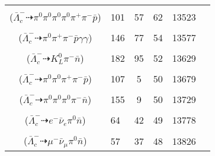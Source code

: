 \documentclass[landscape]{article}
\newcounter{rownumbers}
\newcommand\rn{\stepcounter{rownumbers}\arabic{rownumbers}}
\newcommand{\EOL}{\\} %
\newcommand{\topoTags}[1]{#1} %
\begin{document}
\begin{longtable}{clcccc}
\rn & \makecell[l]{ $ 
\bar{\Lambda}_{c}^{-} \rightarrow \eta^{\prime} \bar{\Sigma}^{-} ,
\eta^{\prime} \rightarrow \pi^{+} \pi^{-} \eta ,
\bar{\Sigma}^{-} \rightarrow \pi^{0} \bar{p} ,
\eta \rightarrow \pi^{0} \pi^{0} \pi^{0} 
$ \\ ($
\bar{\Lambda}_{c}^{-} \dashrightarrow \pi^{0} \pi^{0} \pi^{0} \pi^{0} \pi^{+} \pi^{-} \bar{p} 
$) } & \topoTags{101 & 57 & }62 & 13523 \EOL

\rn & \makecell[l]{ $ 
\bar{\Lambda}_{c}^{-} \rightarrow \eta^{\prime} \bar{\Sigma}^{-} ,
\eta^{\prime} \rightarrow \pi^{+} \pi^{-} \eta ,
\bar{\Sigma}^{-} \rightarrow \pi^{0} \bar{p} ,
\eta \rightarrow \gamma \gamma 
$ \\ ($
\bar{\Lambda}_{c}^{-} \dashrightarrow \pi^{0} \pi^{+} \pi^{-} \bar{p} \gamma \gamma 
$) } & \topoTags{146 & 77 & }54 & 13577 \EOL

\rn & \makecell[l]{ $ 
\bar{\Lambda}_{c}^{-} \rightarrow \pi^{-} K^{0} \bar{n} ,
K^{0} \rightarrow K_{L}^{0} 
$ \\ ($
\bar{\Lambda}_{c}^{-} \dashrightarrow K_{L}^{0} \pi^{-} \bar{n} 
$) } & \topoTags{182 & 95 & }52 & 13629 \EOL

\rn & \makecell[l]{ $ 
\bar{\Lambda}_{c}^{-} \rightarrow \omega \bar{\Delta}^{-} ,
\omega \rightarrow \pi^{0} \pi^{+} \pi^{-} ,
\bar{\Delta}^{-} \rightarrow \pi^{0} \bar{p} 
$ \\ ($
\bar{\Lambda}_{c}^{-} \dashrightarrow \pi^{0} \pi^{0} \pi^{+} \pi^{-} \bar{p} 
$) } & \topoTags{107 & 5 & }50 & 13679 \EOL

\rn & \makecell[l]{ $ 
\bar{\Lambda}_{c}^{-} \rightarrow \pi^{0} \pi^{-} K^{0} \bar{n} ,
K^{0} \rightarrow K_{S}^{0} ,
K_{S}^{0} \rightarrow \pi^{0} \pi^{0} 
$ \\ ($
\bar{\Lambda}_{c}^{-} \dashrightarrow \pi^{0} \pi^{0} \pi^{0} \pi^{-} \bar{n} 
$) } & \topoTags{155 & 9 & }50 & 13729 \EOL

\rn & \makecell[l]{ $ 
\bar{\Lambda}_{c}^{-} \rightarrow e^{-} \bar{\nu}_{e} \bar{\Lambda} ,
\bar{\Lambda} \rightarrow \pi^{0} \bar{n} 
$ \\ ($
\bar{\Lambda}_{c}^{-} \dashrightarrow e^{-} \bar{\nu}_{e} \pi^{0} \bar{n} 
$) } & \topoTags{64 & 42 & }49 & 13778 \EOL

\rn & \makecell[l]{ $ 
\bar{\Lambda}_{c}^{-} \rightarrow \mu^{-} \bar{\nu}_{\mu} \bar{\Lambda} ,
\bar{\Lambda} \rightarrow \pi^{0} \bar{n} 
$ \\ ($
\bar{\Lambda}_{c}^{-} \dashrightarrow \mu^{-} \bar{\nu}_{\mu} \pi^{0} \bar{n} 
$) } & \topoTags{57 & 37 & }48 & 13826 \EOL


\end{longtable}
\end{document}
